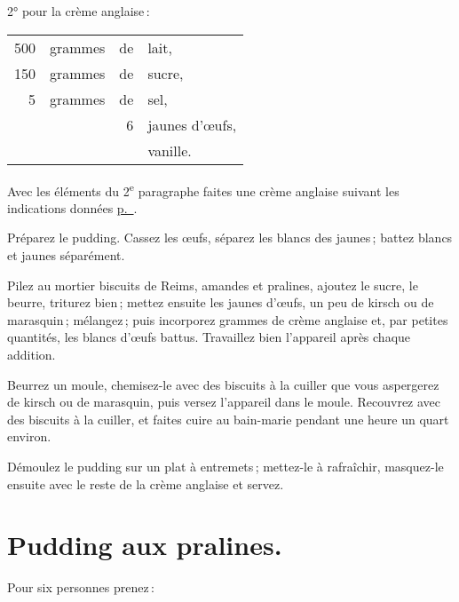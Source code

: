 2° pour la crème anglaise :

\footnotesize
\begin{longtable}{rrrp{16em}}
    500 & grammes & de & lait,                                                                            \\
    150 & grammes & de & sucre,                                                                           \\
      5 & grammes & de & sel,                                                                             \\
        &         &  6 & jaunes d'œufs,                                                                   \\
        &         &    & vanille.                                                                         \\
\end{longtable}
\normalsize

Avec les éléments du 2\textsuperscript{e} paragraphe faites une crème anglaise
suivant les indications données \hyperlink{p0856}{p. \pageref{pg0856}}.

Préparez le pudding. Cassez les œufs, séparez les blancs des jaunes ; battez
blancs et jaunes séparément.

Pilez au mortier biscuits de Reims, amandes et pralines, ajoutez le sucre, le
beurre, triturez bien ; mettez ensuite les jaunes d'œufs, un peu de kirsch ou
de marasquin ; mélangez ; puis incorporez {\mmm} grammes de crème
anglaise et, par petites quantités, les blancs d'œufs battus. Travaillez bien
l'appareil après chaque addition.

Beurrez un moule, chemisez-le avec des biscuits à la cuiller que vous
aspergerez de kirsch ou de marasquin, puis versez l'appareil dans le moule.
Recouvrez avec des biscuits à la cuiller, et faites cuire au bain-marie pendant
une heure un quart environ.

Démoulez le pudding sur un plat à entremets ; mettez-le à rafraîchir,
masquez-le ensuite avec le reste de la crème anglaise et servez.

\section*{\centering Pudding aux pralines.}
{}

Pour six personnes prenez :


